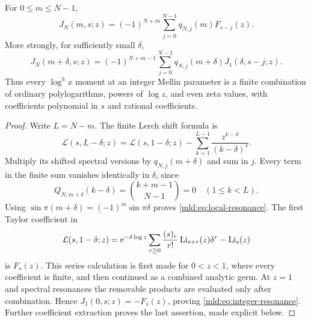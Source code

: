 \begin{theorem}\label{mld:thm:integer-resonance}
For $0\le m\le N-1$,
\begin{equation}\label{mld:eq:integer-resonance}
 \boxed{\displaystyle
 J_N(m,s;z)=(-1)^{N+m}
       \sum_{j=0}^{N-1}q_{N,j}(m)F_{s-j}(z).}
\end{equation}
More strongly, for sufficiently small $\delta$,
\begin{equation}\label{mld:eq:local-resonance}
 J_N(m+\delta,s;z)=(-1)^{N+m-1}
       \sum_{j=0}^{N-1}q_{N,j}(m+\delta)
                                  J_1(\delta,s-j;z).
\end{equation}
Thus every $\log^h x$ moment at an integer Mellin parameter is a finite combination of ordinary polylogarithms, powers of $\log z$, and even zeta values, with coefficients polynomial in $s$ and rational coefficients.
\end{theorem}

\begin{proof}
Write $L=N-m$. The finite Lerch shift formula is
\[
 \mathcal L(s,L-\delta;z)=\mathcal L(s,1-\delta;z)
       -\sum_{k=1}^{L-1}\frac{z^{k-\delta}}{(k-\delta)^s}.
\]
Multiply its shifted spectral versions by $q_{N,j}(m+\delta)$ and sum in $j$. Every term in the finite sum vanishes identically in $\delta$, since
\[
 Q_{N,m+\delta}(k-\delta)
       =\binom{k+m-1}{N-1}=0\quad(1\le k<L).
\]
Using $\sin\pi(m+\delta)=(-1)^m\sin\pi\delta$ proves \eqref{mld:eq:local-resonance}. The first Taylor coefficient in
\[
 \mathcal L(s,1-\delta;z)
 =\mathrm e^{-\delta\log z}
       \sum_{r\ge0}\frac{(s)_r}{r!}\operatorname{Li}_{s+r}(z)\delta^r
       -\operatorname{Li}_s(z)
\]
is $F_s(z)$. This series calculation is first made for $0<z<1$,
where every coefficient is finite, and then continued as a combined
analytic germ. At $z=1$ and spectral resonances the removable
products are evaluated only after combination. Hence $J_1(0,s;z)=-F_s(z)$, proving \eqref{mld:eq:integer-resonance}. Further coefficient extraction proves the last assertion, made explicit below.
\end{proof}


